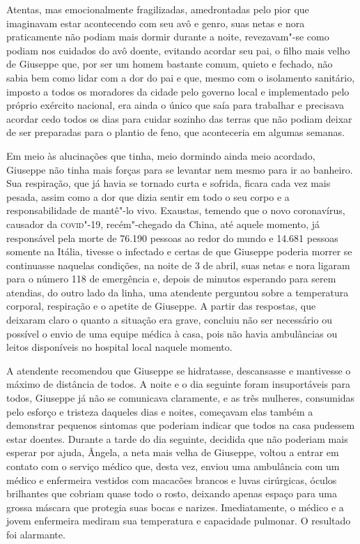 Atentas, mas emocionalmente fragilizadas, amedrontadas pelo pior que
imaginavam estar acontecendo com seu avô e genro, suas netas e nora
praticamente não podiam mais dormir durante a noite, revezavam"-se como
podiam nos cuidados do avô doente, evitando acordar seu pai, o filho
mais velho de Giuseppe que, por ser um homem bastante comum, quieto e
fechado, não sabia bem como lidar com a dor do pai e que, mesmo com o
isolamento sanitário, imposto a todos os moradores da cidade pelo
governo local e implementado pelo próprio exército nacional, era ainda o
único que saía para trabalhar e precisava acordar cedo todos os dias
para cuidar sozinho das terras que não podiam deixar de ser preparadas
para o plantio de feno, que aconteceria em algumas semanas.

Em meio às alucinações que tinha, meio dormindo ainda meio acordado,
Giuseppe não tinha mais forças para se levantar nem mesmo para ir ao
banheiro. Sua respiração, que já havia se tornado curta e sofrida,
ficara cada vez mais pesada, assim como a dor que dizia sentir em todo o
seu corpo e a responsabilidade de mantê"-lo vivo. Exaustas, temendo que o
novo coronavírus, causador da \textsc{covid}"-19, recém"-chegado da China, até
aquele momento, já responsável pela morte de 76.190 pessoas ao redor do
mundo e 14.681 pessoas somente na Itália, tivesse o infectado e certas
de que Giuseppe poderia morrer se continuasse naquelas condições, na
noite de 3 de abril, suas netas e nora ligaram para o número 118 de
emergência e, depois de minutos esperando para serem atendias, do outro
lado da linha, uma atendente perguntou sobre a temperatura corporal,
respiração e o apetite de Giuseppe. A partir das respostas, que deixaram
claro o quanto a situação era grave, concluiu não ser necessário ou
possível o envio de uma equipe médica à casa, pois não havia ambulâncias
ou leitos disponíveis no hospital local naquele momento.

A atendente recomendou que Giuseppe se hidratasse, descansasse e
mantivesse o máximo de distância de todos. A noite e o dia seguinte
foram insuportáveis para todos, Giuseppe já não se comunicava
claramente, e as três mulheres, consumidas pelo esforço e tristeza
daqueles dias e noites, começavam elas também a demonstrar pequenos
sintomas que poderiam indicar que todos na casa pudessem estar doentes.
Durante a tarde do dia seguinte, decidida que não poderiam mais esperar
por ajuda, Ângela, a neta mais velha de Giuseppe, voltou a entrar em
contato com o serviço médico que, desta vez, enviou uma ambulância com
um médico e enfermeira vestidos com macacões brancos e luvas cirúrgicas,
óculos brilhantes que cobriam quase todo o rosto, deixando apenas espaço
para uma grossa máscara que protegia suas bocas e narizes.
Imediatamente, o médico e a jovem enfermeira mediram sua temperatura e
capacidade pulmonar. O resultado foi alarmante.

